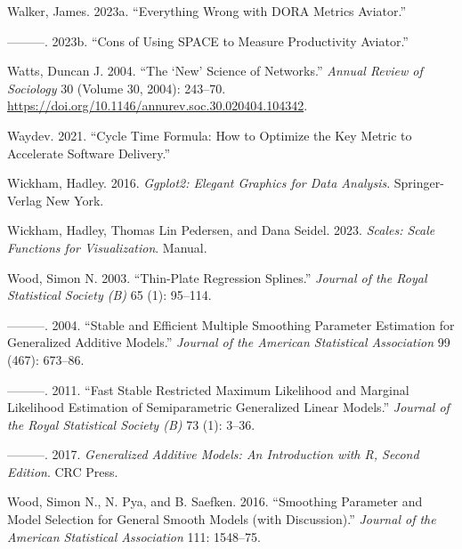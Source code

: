 \documentclass[
]{article}
\newlength{\cslhangindent}
\newenvironment{CSLReferences}[2] %
 {\begin{list}{}{%
  \setlength{\itemindent}{0pt}
  \setlength{\leftmargin}{0pt}
  \setlength{\parsep}{0pt}
  \ifodd #1
   \setlength{\leftmargin}{\cslhangindent}
   \setlength{\itemindent}{-1\cslhangindent}
  \fi
  \setlength{\itemsep}{#2\baselineskip}}}
 {\end{list}}
\begin{document}
\begin{CSLReferences}{1}{0}
Walker, James. 2023a. {``Everything {Wrong} with {DORA Metrics}
{\textbar} {Aviator}.''}

---------. 2023b. {``Cons of {Using SPACE} to {Measure Productivity}
{\textbar} {Aviator}.''}

Watts, Duncan J. 2004. {``The {`{New}'} {Science} of {Networks}.''}
\emph{Annual Review of Sociology} 30 (Volume 30, 2004): 243--70.
\url{https://doi.org/10.1146/annurev.soc.30.020404.104342}.

Waydev. 2021. {``Cycle {Time Formula}: {How} to {Optimize} the {Key
Metric} to {Accelerate Software Delivery}.''}

Wickham, Hadley. 2016. \emph{Ggplot2: {Elegant} Graphics for Data
Analysis}. Springer-Verlag New York.

Wickham, Hadley, Thomas Lin Pedersen, and Dana Seidel. 2023.
\emph{Scales: {Scale} Functions for Visualization}. Manual.

Wood, Simon N. 2003. {``Thin-Plate Regression Splines.''} \emph{Journal
of the Royal Statistical Society (B)} 65 (1): 95--114.

---------. 2004. {``Stable and Efficient Multiple Smoothing Parameter
Estimation for Generalized Additive Models.''} \emph{Journal of the
American Statistical Association} 99 (467): 673--86.

---------. 2011. {``Fast Stable Restricted Maximum Likelihood and
Marginal Likelihood Estimation of Semiparametric Generalized Linear
Models.''} \emph{Journal of the Royal Statistical Society (B)} 73 (1):
3--36.

---------. 2017. \emph{Generalized {Additive Models}: {An Introduction}
with {R}, {Second Edition}}. CRC Press.

Wood, Simon N., N. Pya, and B. Saefken. 2016. {``Smoothing Parameter and
Model Selection for General Smooth Models (with Discussion).''}
\emph{Journal of the American Statistical Association} 111: 1548--75.


\end{CSLReferences}
\end{document}
